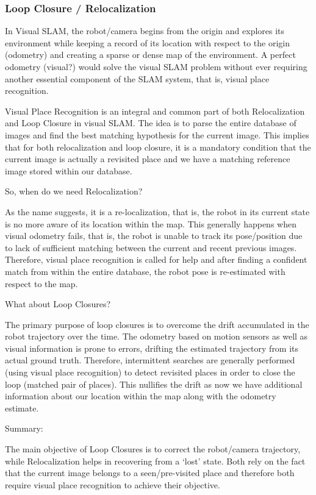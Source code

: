 \subsubsection{Loop Closure / Relocalization}
In Visual SLAM, the robot/camera begins from the origin and explores its environment while keeping a record of its location with respect to the origin (odometry) and creating a sparse or dense map of the environment. A perfect odometry (visual?) would solve the visual SLAM problem without ever requiring another essential component of the SLAM system, that is, visual place recognition.

Visual Place Recognition is an integral and common part of both Relocalization and Loop Closure in visual SLAM. The idea is to parse the entire database of images and find the best matching hypothesis for the current image. This implies that for both relocalization and loop closure, it is a mandatory condition that the current image is actually a revisited place and we have a matching reference image stored within our database.

So, when do we need Relocalization?

As the name suggests, it is a re-localization, that is, the robot in its current state is no more aware of its location within the map. This generally happens when visual odometry fails, that is, the robot is unable to track its pose/position due to lack of sufficient matching between the current and recent previous images. Therefore, visual place recognition is called for help and after finding a confident match from within the entire database, the robot pose is re-estimated with respect to the map.

What about Loop Closures?

The primary purpose of loop closures is to overcome the drift accumulated in the robot trajectory over the time. The odometry based on motion sensors as well as visual information is prone to errors, drifting the estimated trajectory from its actual ground truth. Therefore, intermittent searches are generally performed (using visual place recognition) to detect revisited places in order to close the loop (matched pair of places). This nullifies the drift as now we have additional information about our location within the map along with the odometry estimate.

Summary:

The main objective of Loop Closures is to correct the robot/camera trajectory, while Relocalization helps in recovering from a ‘lost’ state. Both rely on the fact that the current image belongs to a seen/pre-visited place and therefore both require visual place recognition to achieve their objective.


